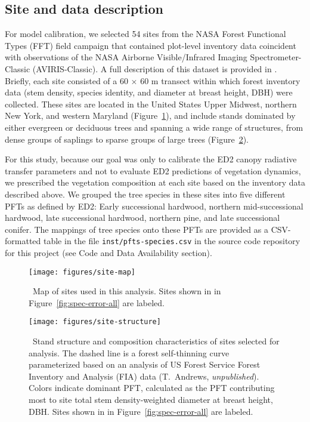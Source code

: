 \subsection{Site and data description}\label{subsec:site-data}

For model calibration, we selected 54 sites from the NASA Forest Functional Types (FFT) field campaign that contained plot-level inventory data coincident with observations of the NASA Airborne Visible/Infrared Imaging Spectrometer-Classic (AVIRIS-Classic).
A full description of this dataset is provided in \citet{singh2015imaging}.
Briefly, each site consisted of a 60 $\times$ 60 m transect within which forest inventory data (stem density, species identity, and diameter at breast height, DBH) were collected.
These sites are located in the United States Upper Midwest, northern New York, and western Maryland (Figure~\ref{fig:site-map}),
and include stands dominated by either evergreen or deciduous trees and spanning a wide range of structures, from dense groups of saplings to sparse groups of large trees (Figure~\ref{fig:site-structure}).

For this study, because our goal was only to calibrate the ED2 canopy radiative transfer parameters and not to evaluate ED2 predictions of vegetation dynamics, we prescribed the vegetation composition at each site based on the inventory data described above.
We grouped the tree species in these sites into five different PFTs as defined by ED2:
Early successional hardwood, northern mid-successional hardwood, late successional hardwood, northern pine, and late successional conifer.
The mappings of tree species onto these PFTs are provided as a CSV-formatted table in the file \texttt{inst/pfts-species.csv} in the source code repository for this project (see Code and Data Availability section).

\begin{figure}
  \centering
  \texttt{[image: figures/site-map]}
  \caption{\
    Map of sites used in this analysis.
    Sites shown in in Figure~\ref{fig:spec-error-all} are labeled.
  }\label{fig:site-map}
\end{figure}

\begin{figure}
  \centering
  \texttt{[image: figures/site-structure]}
  \caption{\
    Stand structure and composition characteristics of sites selected for analysis.
    The dashed line is a forest self-thinning curve \citep[c.f.,][]{zeide2010comparison} parameterized based on an analysis of US Forest Service Forest Inventory and Analysis (FIA) data (T.\ Andrews, \emph{unpublished}).
    Colors indicate dominant PFT, calculated as the PFT contributing most to site total stem density-weighted diameter at breast height, DBH.\@
    Sites shown in in Figure~\ref{fig:spec-error-all} are labeled.
  }\label{fig:site-structure}
\end{figure}

